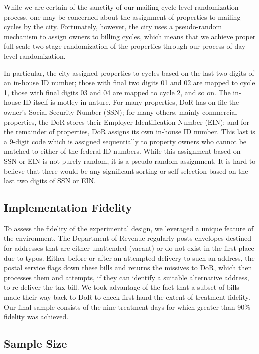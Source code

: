 \documentclass[12pt,titlepage]{article}
\begin{document}
While we are certain of the sanctity of our mailing cycle-level
randomization process, one may be concerned about the assignment of
properties to mailing cycles by the city. Fortunately, however, the
city uses a pseudo-random mechanism to assign owners to billing
cycles, which means that we achieve proper full-scale two-stage
randomization of the properties through our process of day-level
randomization.

In particular, the city assigned properties to cycles based on the
last two digits of an in-house ID number; those with final two digits
01 and 02 are mapped to cycle 1, those with final digits 03 and 04 are
mapped to cycle 2, and so on. The in-house ID itself is motley in
nature. For many properties, DoR has on file the owner's Social
Security Number (SSN); for many others, mainly commercial properties,
the DoR stores their Employer Identification Number (EIN); and for the
remainder of properties, DoR assigns its own in-house ID number. This
last is a 9-digit code which is assigned sequentially to property
owners who cannot be matched to either of the federal ID
numbers. While this assignment based on SSN or EIN is not purely
random, it is a pseudo-random assignment. It is hard to believe that
there would be any significant sorting or self-selection based on the
last two digits of SSN or EIN.

\subsection{Implementation Fidelity}

To assess the fidelity of the experimental design, we leveraged a
unique feature of the environment. The Department of Revenue regularly
posts envelopes destined for addresses that are either unattended
(vacant) or do not exist in the first place due to typos. Either
before or after an attempted delivery to such an address, the postal
service flags down these bills and returns the missives to DoR, which
then processes them and attempts, if they can identify a suitable
alternative address, to re-deliver the tax bill. We took advantage of
the fact that a subset of bills made their way back to DoR to check
first-hand the extent of treatment fidelity. Our final sample consists
of the nine treatment days for which greater than 90\% fidelity was
achieved.

\subsection{Sample Size}
\end{document}
